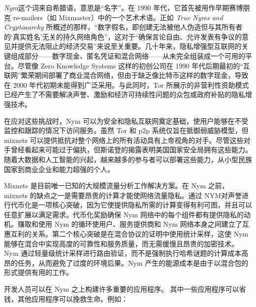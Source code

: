 \documentclass{article}
\begin{document}
	\emph{Nym}这个词来自希腊语，意思是“名字”。在 1990 年代，它首先被用作早期赛博朋克 re-mailers（如 Mixmaster）中的一个艺术术语\cite{ref23}。正如 \emph{True Nyms and Cryptoaarchy} 所概述的那样，“数字假名，即创建无法被他人伪造但与其所有者的‘真实姓名’无关的持久网络角色”，这对于“确保言论自由、允许发表有争议的意见并提供无法阻止的经济交易”来说至关重要\cite{ref78}。几十年来，隐私增强型互联网的关键组成部分——数字现金、匿名凭证和混合网络——从未完全组装成一个可用的平台。尽管像 Zero Knowledge Systems 这样的初创公司在 1990 年代后期最初的“互联网”繁荣期间部署了商业混合网络，但由于缺乏像比特币这样的数字现金，导致在 2000 年代初期未能得到广泛采用。与此同时，Tor 所展示的非营利性资助模式已经产生了不需要解决声誉、激励和经济可持续性问题的众包或政府补贴的隐私增强技术。\newline

	在应对这些挑战时，Nym 可以为安全和隐私互联网奠定基础，使用户能够在不受监控和跟踪的情况下访问服务。虽然 Tor 和 p2p 系统仅旨在抵御弱威胁模型，但 mixnets 可以提供抵抗对整个网络上的所有活动具有上帝视角的对手。尽管这些对手曾经看起来可能过于偏执，但斯诺登的揭露表明美国国家安全局拥有这些能力。随着大数据和人工智能的兴起，越来越多的参与者可以部署这些能力，从小型民族国家到商业企业和能力超强的个人。\newline

	Mixnets 是目前唯一已知的大规模流量分析工作解决方案。在 Nym 之前，mixnets 的缺点之一是需要昂贵的计算才能使网络流量隐私。通过 NYM对声誉进行代币化是一项核心突破，因为它使提供隐私所需的计算变得有利可图，并且可以任意扩展以满足需求。代币化奖励确保 Nym 网络中的每个组件都有提供隐私的动机。赚取和使用 Nym 的循环使用户、服务提供商和 Nym 网络本身之间建立了互惠互利的关系。第二个核心突破是在混合协议的证明中使用统计采样，这使 Nym 能够在混合中实现高度的可靠性和服务质量，而无需缓慢且昂贵的加密技术。Nym 通过轻量级统计采样进行路由验证，而不是强制执行哈希谜题的计算成本高昂的任务，从而避免了过度的环境后果。Nym 产生的能源成本是由于以混合包的形式提供有用的工作。\newline

	开发人员可以在 Nym 之上构建许多重要的应用程序。 其中一些应用程序可以省钱，其他应用程序可以挽救生命。例如：
	
\end{document}
